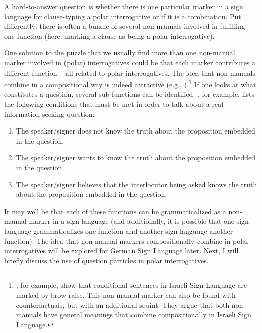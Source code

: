 A hard-to-answer question is whether there is one particular marker in a sign language for clause-typing a polar interrogative or if it is a combination. Put differently: there is often a bundle of several non-manuals involved in fulfilling one function (here: marking a clause as being a polar interrogative).

One solution to the puzzle that we usually find more than one non-manual marker involved in (polar) interrogatives could be that each marker contributes a different function -- all related to polar interrogatives. The idea that non-manuals combine in a compositional way is indeed attractive (e.g., \citealt{nespor1999prosody, sandler2006sign, dachkovsky2009visual, herrmann2013modal}).\footnote{\citet{dachkovsky2009visual}, for example, show that conditional sentences in Israeli Sign Language are marked by brow-raise. This non-manual marker can also be found with counterfactuals, but with an additional squint. They argue that both non-manuals have general meanings that combine compositionally in Israeli Sign Language.} If one looks at what constitutes a question, several sub-functions can be identified. \citet[4]{dayal2016questions}, for example, lists the following conditions that must be met in order to talk about a real information-seeking question:

\begin{enumerate}[itemsep=0pt]
	\item The speaker/signer does not know the truth about the proposition embedded in the question.
	\item The speaker/signer wants to know the truth about the proposition embedded in the question.
	\item The speaker/signer believes that the interlocutor being asked knows the truth about the proposition embedded in the question.
\end{enumerate}


\noindent It may well be that each of these functions can be grammaticalized as a non-manual marker in a sign language (and additionally, it is possible that one sign language grammaticalizes one function and another sign language another function). The idea that non-manual markers compositionally combine in polar interrogatives will be explored for German Sign Language later. Next, I will briefly discuss the use of question particles in polar interrogatives.

